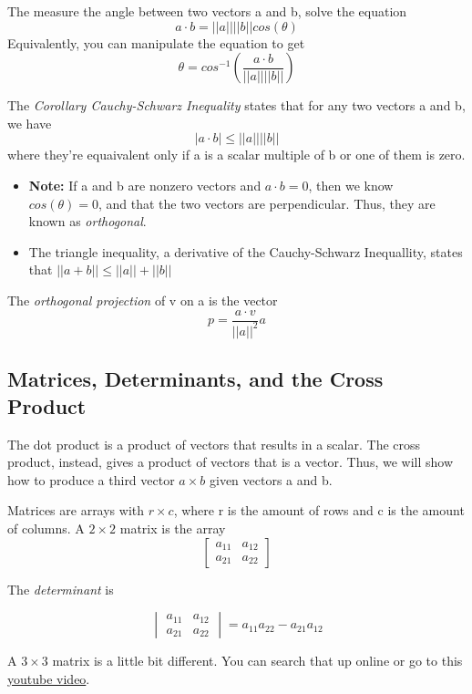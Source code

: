 \documentclass[12pt, letterpaper]{article}
\begin{document}
The measure the angle between two vectors a and b, solve the equation \[a \cdot b = ||a||||b||cos(\theta)\] Equivalently, you can manipulate the equation to get \[\theta = cos^{-1}(\frac{a \cdot b}{||a||||b||})\]

The \textit{Corollary Cauchy-Schwarz Inequality} states that for any two vectors a and b, we have \[|a \cdot b| \leq ||a||||b||\] where they're equaivalent only if a is a scalar multiple of b or one of them is zero.
\begin{itemize}
    \item \textbf{Note: }If a and b are nonzero vectors and \(a \cdot b = 0\), then we know \(cos(\theta) = 0\), and that the two vectors are perpendicular. Thus, they are known as \textit{orthogonal}.
    \item The triangle inequality, a derivative of the Cauchy-Schwarz Inequallity, states that \(||a + b|| \leq ||a|| + ||b||\)
\end{itemize}

The \textit{orthogonal projection} of v on a is the vector \[p = \frac{a \cdot v}{||a||^{2}}a \]

\subsection{Matrices, Determinants, and the Cross Product}

The dot product is a product of vectors that results in a scalar. The cross product, instead, gives a product of vectors that is a vector. Thus, we will show how to produce a third vector \(a \times b\) given vectors a and b.

Matrices are arrays with \(r \times c\), where r is the amount of rows and c is the amount of columns. A \(2 \times 2\) matrix is the array
\[
\begin{bmatrix}
a_{11} & a_{12}\\
a_{21} & a_{22}
\end{bmatrix}
\]

The \textit{determinant} is 

\[
\begin{vmatrix}
a_{11} & a_{12}\\
a_{21} & a_{22}
\end{vmatrix}
= a_{11}a_{22} - a_{21}a_{12}
\]

A \(3 \times 3\) matrix is a little bit different. You can search that up online or go to this \href{https://www.youtube.com/watch?v=eYjSu_xXUUQ&ab_channel=TheOrganicChemistryTutor}{youtube video}.
\end{document}
